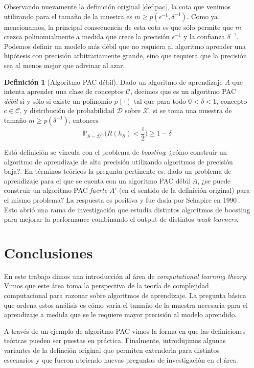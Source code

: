 \documentclass{article}
\theoremstyle{definition}
\newtheorem{definition}{Definici\'on}%
\begin{document}

Observando nuevamente la definici\'on original \ref{def:pac}, la cota que venimos utilizando para el tama\~no de la muestra es $m \geq p(\epsilon^{-1}, \delta^{-1})$. Como ya mencionamos, la principal consecuencia de esta cota es que s\'olo permite que $m$ crezca polinomialmente a medida que crece la precisi\'on $\epsilon^{-1}$ y la confianza $\delta^{-1}$. 
Podemos definir un modelo m\'as d\'ebil que no requiera al algoritmo aprender una hip\'otesis con precisi\'on arbitrariamente grande, sino que requiera que la precisi\'on sea al menos mejor que adivinar al azar.

\begin{definition}[Algoritmo PAC d\'ebil]
    \label{def:pac-debil}
    Dado un algoritmo de aprendizaje $A$ que intenta aprender una clase de conceptos $\mathcal{C}$, decimos que es un algoritmo PAC \emph{d\'ebil} si y s\'olo si existe un polinomio $p(\cdot)$ tal que para todo $0 < \delta < 1$, concepto $c \in \mathcal{C}$, y distribuci\'on de probabilidad $\mathcal{D}$ sobre $\mathcal{X}$, si se toma una muestra de tama\~no $m \geq p(\delta^{-1})$, entonces
    $$
    \mathbb{P}_{S\sim\mathcal{D}^m}\big(R(h_S) < \frac{1}{2}\big) \geq 1 - \delta
    $$
\end{definition}

Est\'a definici\'on se vincula con el problema de \emph{boosting}: ¿c\'omo construir un algoritmo de aprendizaje de alta precisi\'on utilizando algoritmos de precisi\'on baja?. En t\'erminos te\'oricos la pregunta pertinente es: dado un problema de aprendizaje para el que se cuenta con un algoritmo PAC d\'ebil $A$, ¿se puede construir un algoritmo PAC \emph{fuerte} $A'$ (en el sentido de la definici\'on original) para el mismo problema? La respuesta es positiva y fue dada por Schapire en 1990 \cite{schapire:ml-5_2}. Esto abri\'o una rama de investigaci\'on que estudia distintos algoritmos de boosting para mejorar la performance combinando el output de distintos \emph{weak learners}.

\section{Conclusiones}
\label{sec:conclusiones}

En este trabajo dimos una introducci\'on al \'area de \emph{computational learning theory}. Vimos que este \'area toma la perspectiva de la teor\'ia de complejidad computacional para razonar sobre algoritmos de aprendizaje. La pregunta b\'asica que ordena estos an\'alisis es c\'omo var\'ia el tama\~no de la muestra necesaria para el aprendizaje a medida que se le requiere mayor precisi\'on al modelo aprendido.

A trav\'es de un ejemplo de algoritmo PAC vimos la forma en que las definiciones te\'oricas pueden ser puestas en pr\'actica. Finalmente, introdujimos algunas variantes de la definci\'on original que permiten extenderla para distintos escenarios y que fueron abriendo nuevas preguntas de investigaci\'on en el \'area.



\end{document}
